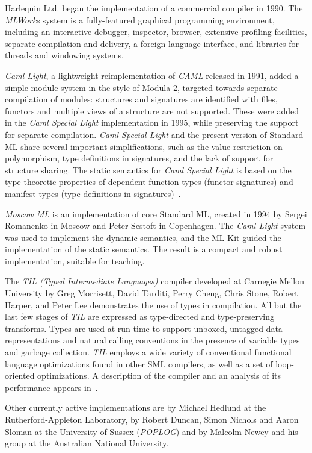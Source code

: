 Harlequin Ltd. began the implementation of a commercial compiler in 1990.  The
{\em MLWorks} system is a fully-featured graphical programming environment,
including an interactive debugger, inspector, browser, extensive profiling
facilities, separate compilation and delivery, a foreign-language interface,
and libraries for threads and windowing systems.  

{\em Caml Light}, a lightweight reimplementation of {\em CAML} released in
1991, added a simple module system in the style of Modula-2, targeted towards
separate compilation of modules: structures and signatures are identified with
files, functors and multiple views of a structure are not supported.  These
were added in the {\em Caml Special Light} implementation in 1995, while
preserving the support for separate compilation. {\em Caml Special Light} and
the present version of Standard ML share several important simplifications,
such as the value restriction on polymorphism, type definitions in signatures,
and the lack of support for structure sharing.  The static semantics for {\em
Caml Special Light} is based on the type-theoretic properties of dependent
function types (functor signatures) and manifest types (type definitions in
signatures)~\cite{leroy94}.

{\em Moscow ML} is an implementation of core Standard ML, created in 1994 by
Sergei Romanenko in Moscow and Peter Sestoft in Copenhagen.  The {\em Caml
Light} system was used to implement the dynamic semantics, and the ML Kit
guided the implementation of the static semantics.  The result is a compact
and robust implementation, suitable for teaching.

The {\em TIL (Typed Intermediate Languages)} compiler developed at Carnegie
Mellon
University by Greg Morrisett, David Tarditi, Perry Cheng, Chris Stone,
Robert Harper,
and Peter Lee demonstrates the use of
types in compilation.  All but the last few stages of {\em TIL} are expressed
as type-directed and type-preserving transforms.  Types are used at run time
to support unboxed, untagged data representations and natural calling
conventions in the presence of variable types and garbage collection.  {\em
TIL} employs a wide variety of conventional functional language optimizations
found in other SML compilers, as well as a set of loop-oriented optimizations.
A description of the compiler and an analysis of its performance appears
in~\cite{Tar}.

Other currently active implementations are by Michael Hedlund at the
Rutherford-Appleton Laboratory, by Robert Duncan, Simon Nichols and Aaron
Sloman at the University of Sussex ({\em POPLOG}) and by Malcolm Newey and his
group at the Australian National University.
 
